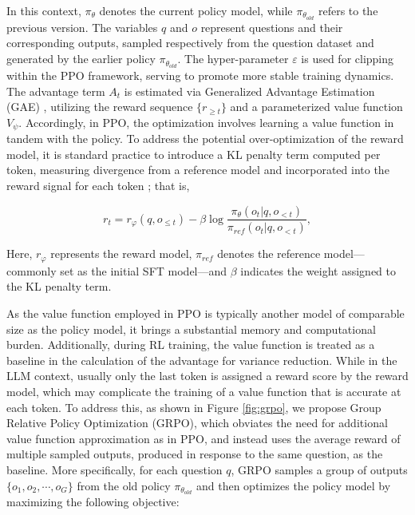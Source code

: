 In this context, $\pi_{\theta}$ denotes the current policy model, while $\pi_{\theta_{old}}$ refers to the previous version. The variables $q$ and $o$ represent questions and their corresponding outputs, sampled respectively from the question dataset and generated by the earlier policy $\pi_{\theta_{old}}$. The hyper-parameter $\varepsilon$ is used for clipping within the PPO framework, serving to promote more stable training dynamics. The advantage term $A_t$ is estimated via Generalized Advantage Estimation (GAE) \citep{gae}, utilizing the reward sequence $\{r_{\ge t}\}$ and a parameterized value function $V_{\psi}$. Accordingly, in PPO, the optimization involves learning a value function in tandem with the policy. To address the potential over-optimization of the reward model, it is standard practice to introduce a KL penalty term computed per token, measuring divergence from a reference model and incorporated into the reward signal for each token \citep{ouyang2022training}; that is,

\begin{equation}
    r_{t} = r_\varphi(q, o_{\le t}) - \beta \log\frac{\pi_{\theta}(o_{t}|q, o_{<t})}{\pi_{ref}(o_{t}|q, o_{<t})},
\label{eq:PPO-reward}
\end{equation}

Here, $r_\varphi$ represents the reward model, $\pi_{ref}$ denotes the reference model—commonly set as the initial SFT model—and $\beta$ indicates the weight assigned to the KL penalty term.

As the value function employed in PPO is typically another model of comparable size as the policy model, it brings a substantial memory and computational burden. Additionally, during RL training, the value function is treated as a baseline in the calculation of the advantage for variance reduction. While in the LLM context, usually only the last token is assigned a reward score by the reward model, which may complicate the training of a value function that is accurate at each token. To address this, as shown in Figure \ref{fig:grpo}, we propose Group Relative Policy Optimization (GRPO), which obviates the need for additional value function approximation as in PPO, and instead uses the average reward of multiple sampled outputs, produced in response to the same question, as the baseline. More specifically, for each question $q$, GRPO samples a group of outputs $\{o_1, o_2, \cdots, o_G\}$  from the old policy  $\pi_{\theta_{old}}$  and then optimizes the policy model by maximizing the following objective:

